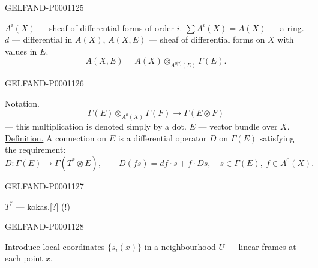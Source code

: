 \begin{GelfandAdjacentEvidence}{GELFAND-P000112}{5}

$A^i(X)$ — sheaf of differential forms of order $i$.
$\sum A^i(X)=A(X)$ — a ring.
$d$ — differential in $A(X)$, $A(X,E)$ — sheaf of differential forms on $X$ with values in $E$.
\begin{equation*}A(X,E)=A(X)\otimes_{A^{0\text{[?]}}(E)}\Gamma(E).\end{equation*}
\end{GelfandAdjacentEvidence}
\begin{GelfandAdjacentEvidence}{GELFAND-P000112}{6}

Notation.
\begin{equation*}\Gamma(E)\otimes_{A^0(X)}\Gamma(F)\longrightarrow\Gamma(E\otimes F)\end{equation*}
— this multiplication is denoted simply by a dot.
$E$ — vector bundle over $X$.
\underline{Definition.} A connection on $E$ is a differential operator $D$ on $\Gamma(E)$ satisfying the requirement:
\begin{equation*}
D:\Gamma(E)\longrightarrow\Gamma(T^*\otimes E),\qquad
D(fs)=df\cdot s+f\cdot Ds,\quad s\in\Gamma(E),\ f\in A^0(X).
\end{equation*}
\end{GelfandAdjacentEvidence}
\begin{GelfandAdjacentEvidence}{GELFAND-P000112}{7}

$T^*$ — kokas.[?] (!)
\end{GelfandAdjacentEvidence}
\begin{GelfandAdjacentEvidence}{GELFAND-P000112}{8}

Introduce local coordinates $\{s_i(x)\}$ in a neighbourhood $U$ — linear frames at each point $x$.
\end{GelfandAdjacentEvidence}
